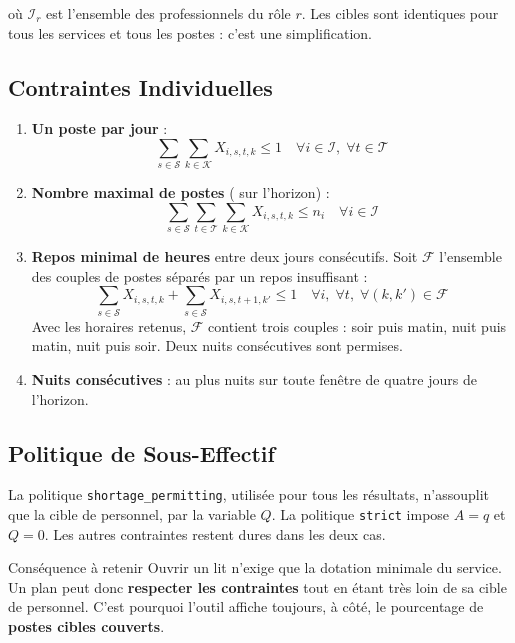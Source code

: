 où $\mathcal{I}_r$ est l'ensemble des professionnels du rôle $r$. Les cibles sont identiques pour tous les services et tous les postes : c'est une simplification.

\subsection{Contraintes Individuelles}
\begin{enumerate}
    \item \textbf{Un poste par jour} :
    \begin{equation}
        \sum_{s \in \mathcal{S}} \sum_{k \in \mathcal{K}} X_{i,s,t,k} \le 1 \quad \forall i \in \mathcal{I}, \; \forall t \in \mathcal{T}
    \end{equation}
    \item \textbf{Nombre maximal de postes} (\PostesMax{} sur l'horizon) :
    \begin{equation}
        \sum_{s \in \mathcal{S}} \sum_{t \in \mathcal{T}} \sum_{k \in \mathcal{K}} X_{i,s,t,k} \le n_i \quad \forall i \in \mathcal{I}
    \end{equation}
    \item \textbf{Repos minimal de \ReposMin{} heures} entre deux jours consécutifs. Soit $\mathcal{F}$ l'ensemble des couples de postes séparés par un repos insuffisant :
    \begin{equation}
        \sum_{s \in \mathcal{S}} X_{i,s,t,k} + \sum_{s \in \mathcal{S}} X_{i,s,t+1,k'} \le 1 \quad \forall i, \; \forall t, \; \forall (k,k') \in \mathcal{F}
    \end{equation}
    Avec les horaires retenus, $\mathcal{F}$ contient trois couples : soir puis matin, nuit puis matin, nuit puis soir. Deux nuits consécutives sont permises.
    \item \textbf{Nuits consécutives} : au plus \NuitsMax{} nuits sur toute fenêtre de quatre jours de l'horizon.
\end{enumerate}

\subsection{Politique de Sous-Effectif}
La politique \texttt{shortage\_permitting}, utilisée pour tous les résultats, n'assouplit que la cible de personnel, par la variable $Q$. La politique \texttt{strict} impose $A = q$ et $Q = 0$. Les autres contraintes restent dures dans les deux cas.

\begin{notebox}{Conséquence à retenir}
Ouvrir un lit n'exige que la dotation minimale du service. Un plan peut donc \textbf{respecter les contraintes} tout en étant très loin de sa cible de personnel. C'est pourquoi l'outil affiche toujours, à côté, le pourcentage de \textbf{postes cibles couverts}.
\end{notebox}

